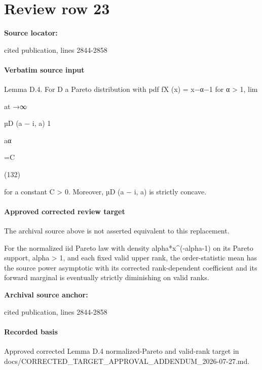 \documentclass[10pt]{article}
\begin{document}
\section*{Review row 23}
\textbf{Source locator:} {\footnotesize\raggedright cited publication, lines 2844-\allowbreak{}2858\par}
\paragraph{Verbatim source input}
\begin{ReviewVerbatim}
Lemma D.4. For D a Pareto distribution with pdf fX (x) = x−α−1 for α > 1,
lim

at →∞

µD (a − i, a)
1

aα

=C

(132)

for a constant C > 0. Moreover, µD (a − i, a) is strictly concave.
\end{ReviewVerbatim}

\paragraph{Approved corrected review target}
The archival source above is not asserted equivalent to this replacement.
\begin{ReviewVerbatim}
For the normalized iid Pareto law with density alpha*x^(-alpha-1) on its Pareto support, alpha > 1, and each fixed valid upper rank, the order-statistic mean has the source power asymptotic with its corrected rank-dependent coefficient and its forward marginal is eventually strictly diminishing on valid ranks.
\end{ReviewVerbatim}

\textbf{Archival source anchor:} {\footnotesize\raggedright cited publication, lines 2844-\allowbreak{}2858\par}
\paragraph{Recorded basis}
Approved corrected Lemma D.\allowbreak{}4 normalized-\allowbreak{}Pareto and valid-\allowbreak{}rank target in docs/\allowbreak{}CORRECTED\_\allowbreak{}TARGET\_\allowbreak{}APPROVAL\_\allowbreak{}ADDENDUM\_\allowbreak{}2026-\allowbreak{}07-\allowbreak{}27.\allowbreak{}md.\allowbreak{}
\end{document}

